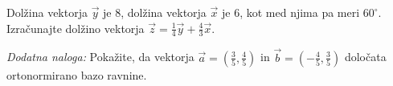 \documentclass[addpoints]{exam}
\begin{document}
\begin{questions}

\begin{solution}[4cm]

\end{solution}


\newpage




    \question[4]
    Dolžina vektorja $\overrightarrow{y}$ je $8$, dolžina vektorja $\overrightarrow{x}$ je $6$, 
    kot med njima pa meri $60^\circ$. 
    Izračunajte dolžino vektorja $\overrightarrow{z}=\frac{1}{4}\overrightarrow{y}+\frac{4}{3}\overrightarrow{x}$.
        


    \begin{solution}[10cm]

    \end{solution}





    \bonusquestion[3]
    \textit{Dodatna naloga:} Pokažite, da vektorja $\overrightarrow{a}=\left(\frac{3}{5},\frac{4}{5}\right)$ in $\overrightarrow{b}=\left(-\frac{4}{5},\frac{3}{5}\right)$ določata ortonormirano bazo ravnine.

    \begin{solution}[1cm]

    \end{solution}

\end{questions}
\end{document}
